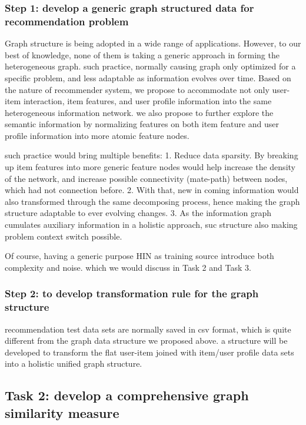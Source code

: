 \documentclass[12pt,a4 paper,title page]{article}
\begin{document}
\subsubsection*{Step 1: develop a generic graph structured data for recommendation problem}

Graph structure is being adopted in a wide range of applications. However, to our best of knowledge, none of them is taking a generic approach in forming the heterogeneous graph. such practice, normally causing graph only optimized for a specific problem, and less adaptable as information evolves over time. Based on the nature of recommender system, we propose to accommodate not only user-item interaction, item features, and user profile information into the same heterogeneous information network. we also propose to further explore the semantic information by normalizing features on both item feature and user profile information into more atomic feature nodes. 

such practice would bring multiple benefits: 
1. Reduce data sparsity. By breaking up item features into more generic feature nodes would help increase the density of the network, and increase possible connectivity (mate-path) between nodes, which had not connection before.
2. With that, new in coming information would also transformed through the same decomposing process, hence making the graph structure adaptable to ever evolving changes.
3. As the information graph cumulates auxiliary information in a holistic approach, suc structure also making problem context switch possible. 

Of course, having a generic purpose HIN as training source introduce both complexity and noise. which we would discuss in Task 2 and Task 3.


\subsubsection*{Step 2: to develop transformation rule for the graph structure}
recommendation test data sets are normally saved in csv format, which is quite different from the graph data structure we proposed above. a structure will be developed to transform the flat user-item joined with item/user profile data sets into a holistic unified graph structure.


\subsection{Task 2: develop a comprehensive graph similarity measure}
\end{document}
